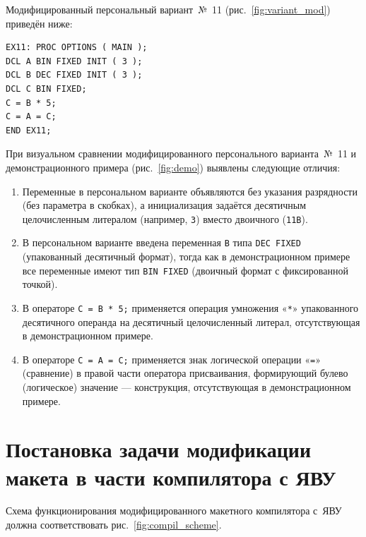 \documentclass[a4paper,14pt]{extarticle}
\begin{document}
Модифицированный персональный вариант~№~11 (рис.~\ref{fig:variant_mod})
приведён ниже:

\begin{lstlisting}[style=PLIstyle]
EX11: PROC OPTIONS ( MAIN );
DCL A BIN FIXED INIT ( 3 );
DCL B DEC FIXED INIT ( 3 );
DCL C BIN FIXED;
C = B * 5;
C = A = C;
END EX11;
\end{lstlisting}

При визуальном сравнении модифицированного персонального варианта~№~11
и демонстрационного примера (рис.~\ref{fig:demo}) выявлены следующие отличия:

\begin{enumerate}
  \item Переменные в персональном варианте объявляются без указания
        разрядности (без параметра в скобках), а инициализация задаётся
        десятичным целочисленным литералом (например, \texttt{3}) вместо
        двоичного (\texttt{11B}).

  \item В персональном варианте введена переменная \texttt{B} типа
        \texttt{DEC FIXED} (упакованный десятичный формат), тогда как в
        демонстрационном примере все переменные имеют тип \texttt{BIN FIXED}
        (двоичный формат с фиксированной точкой).

  \item В операторе \texttt{C = B * 5;} применяется операция умножения «\texttt{*}»
        упакованного десятичного операнда на десятичный целочисленный литерал,
        отсутствующая в демонстрационном примере.

  \item В операторе \texttt{C = A = C;} применяется знак логической операции
        «\texttt{=}» (сравнение) в правой части оператора присваивания,
        формирующий булево (логическое) значение — конструкция, отсутствующая
        в демонстрационном примере.
\end{enumerate}

\section{Постановка задачи модификации макета в части компилятора с ЯВУ}

Схема функционирования модифицированного макетного компилятора с~ЯВУ должна
соответствовать рис.~\ref{fig:compil_scheme}.
\end{document}
